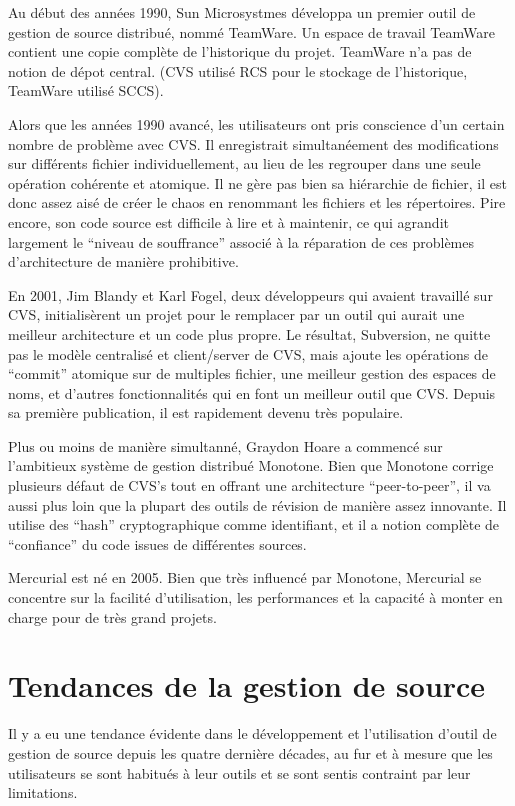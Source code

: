 Au début des années 1990, Sun Microsystmes développa un premier outil de gestion de source distribué, nommé TeamWare. Un espace de travail TeamWare contient une copie complète de l'historique du projet. TeamWare n'a pas de notion de dépot central. (CVS utilisé RCS pour le stockage de l'historique, TeamWare utilisé SCCS).

Alors que les années 1990 avancé, les utilisateurs ont pris conscience d'un certain nombre de problème avec CVS. Il enregistrait simultanéement des modifications sur différents fichier individuellement, au lieu de les regrouper dans une seule opération cohérente et atomique. Il ne gère pas bien sa hiérarchie de fichier, il est donc assez aisé de créer le chaos en renommant les fichiers et les répertoires. Pire encore, son code source est difficile à lire et à maintenir, ce qui agrandit largement le ``niveau de souffrance'' associé à la réparation de ces problèmes d'architecture de manière prohibitive. 


En 2001, Jim Blandy et Karl Fogel, deux développeurs qui avaient travaillé sur CVS, initialisèrent un projet pour le remplacer par un outil qui aurait une meilleur architecture et un code plus propre. Le résultat, Subversion, ne quitte pas le modèle centralisé et client/server de CVS, mais ajoute les opérations de ``commit'' atomique sur de multiples fichier, une meilleur gestion des espaces de noms, et d'autres fonctionnalités qui en font un meilleur outil que CVS. Depuis sa première publication, il est rapidement devenu très populaire.

Plus ou moins de manière simultanné, Graydon Hoare a commencé sur l'ambitieux système de gestion distribué Monotone. Bien que Monotone corrige plusieurs défaut de CVS's tout en offrant une architecture ``peer-to-peer'', il va aussi plus loin que la plupart des outils de révision de manière assez innovante. Il utilise des ``hash'' cryptographique comme identifiant, et il a notion complète de ``confiance'' du code issues de différentes sources.

Mercurial est né en 2005. Bien que très influencé par Monotone, Mercurial se concentre sur la facilité d'utilisation, les performances et la capacité à monter en charge pour de très grand projets.

\section{Tendances de la gestion de source}

Il y a eu une tendance évidente dans le développement et l'utilisation d'outil de gestion de source depuis les quatre dernière décades, au fur et à mesure que les utilisateurs se sont habitués à leur outils et se sont sentis contraint par leur limitations.

